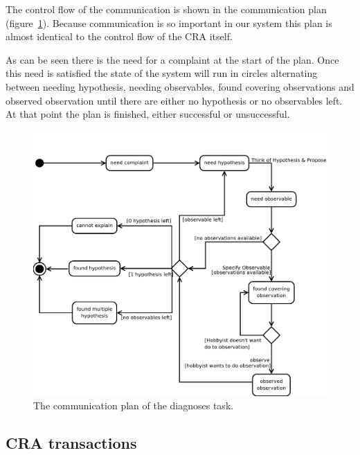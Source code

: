The control flow of the communication is shown in the communication plan (figure~\ref{fig:communicationPlan}). Because communication is so important in our system this plan is almost identical to the control flow of the CRA itself. 

As can be seen there is the need for a complaint at the start of the plan. Once this need is satisfied the state of the system will run in circles alternating between needing hypothesis, needing observables, found covering observations and observed observation until there are either no hypothesis or no observables left. At that point the plan is finished, either successful or unsuccessful.

\begin{figure}[htbp]
	\centering
		\includegraphics[width=1.00\textwidth]{communicationPlan.pdf}
	\caption{The communication plan of the diagnoses task.}
	\label{fig:communicationPlan}
\end{figure}

\subsection{CRA transactions}


